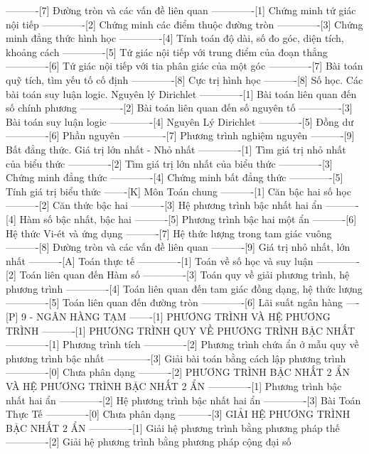 ----------[7] Đường tròn và các vấn đề liên quan
-------------[1] Chứng minh tứ giác nội tiếp
-------------[2] Chứng minh các điểm thuộc đường tròn
-------------[3] Chứng minh đẳng thức hình học
-------------[4] Tính toán độ dài, số đo góc, diện tích, khoảng cách
-------------[5] Tứ giác nội tiếp với trung điểm của đoạn thẳng
-------------[6] Tứ giác nội tiếp với tia phân giác của một góc
-------------[7] Bài toán quỹ tích, tìm yếu tố cố định
-------------[8] Cực trị hình học
----------[8] Số học. Các bài toán suy luận logic. Nguyên lý Dirichlet
-------------[1] Bài toán liên quan đến số chính phương
-------------[2] Bài toán liên quan đến số nguyên tố
-------------[3] Bài toán suy luận logic
-------------[4] Nguyên Lý Dirichlet
-------------[5] Đồng dư
-------------[6] Phần nguyên
-------------[7] Phương trình nghiệm nguyên
----------[9] Bất đẳng thức. Giá trị lớn nhất - Nhỏ nhất
-------------[1] Tìm giá trị nhỏ nhất của biểu thức
-------------[2] Tìm giá trị lớn nhất của biểu thức
-------------[3] Chứng minh đẳng thức
-------------[4] Chứng minh bất đẳng thức
-------------[5] Tính giá trị biểu thức
-------[K] Môn Toán chung
----------[1] Căn bậc hai số học
----------[2] Căn thức bậc hai
----------[3] Hệ phương trình bậc nhất hai ẩn
----------[4] Hàm số bậc nhất, bậc hai
----------[5] Phương trình bậc hai một ẩn
----------[6] Hệ thức Vi-ét và ứng dụng
----------[7] Hệ thức lượng trong tam giác vuông
----------[8] Đường tròn và các vấn đề liên quan
----------[9] Giá trị nhỏ nhất, lớn nhất
----------[A] Toán thực tế
-------------[1] Toán về số học và suy luận
-------------[2] Toán liên quan đến Hàm số
-------------[3] Toán quy về giải phương trình, hệ phương trình
-------------[4] Toán liên quan đến tam giác đồng dạng, hệ thức lượng
-------------[5] Toán liên quan đến đường tròn
-------------[6] Lãi suất ngân hàng
----[P] 9 - NGÂN HÀNG TẠM
-------[1] PHƯƠNG TRÌNH VÀ HỆ PHƯƠNG TRÌNH
----------[1] PHƯƠNG TRÌNH QUY VỀ PHƯƠNG TRÌNH BẬC NHẤT
-------------[1] Phương trình tích
-------------[2] Phương trình chứa ẩn ở mẫu quy về phương trình bậc nhất
-------------[3] Giải bài toán bằng cách lập phương trình
-------------[0] Chưa phân dạng
----------[2] PHƯƠNG TRÌNH BẬC NHẤT 2 ẨN VÀ HỆ PHƯƠNG TRÌNH BẬC NHẤT 2 ẨN
-------------[1] Phương trình bậc nhất hai ẩn
-------------[2] Hệ phương trình bậc nhất hai ẩn
-------------[3] Bài Toán Thực Tế
-------------[0] Chưa phân dạng
----------[3] GIẢI HỆ PHƯƠNG TRÌNH BẬC NHẤT 2 ẨN
-------------[1] Giải hệ phương trình bằng phương pháp thế
-------------[2] Giải hệ phương trình bằng phương pháp cộng đại số
